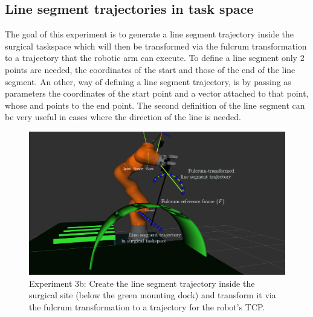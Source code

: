 \subsection{Line segment trajectories in task space}

The goal of this experiment is to generate a line segment trajectory inside the surgical
taskspace which will then be transformed via the fulcrum transformation to a trajectory that the robotic arm can execute. To define a line segment only 
2 points are needed, the coordinates of the start and those of the end of the line segment. An other, way of defining a line segment trajectory, 
is by passing as parameters the coordinates of the start point and a vector attached to that point, whose and points to the end point. The second definition 
of the line segment can be very useful in cases where the direction of the line is needed.

\begin{center}
\begin{figure}[!htb]
\centering
\includegraphics[width=\textwidth]{images/robot_planner3/3b_line_seg.png}
\caption{Experiment 3b: Create the line segment trajectory inside the surgical site (below the green mounting dock) and transform it via the fulcrum transformation to a trajectory for the robot's TCP.}
\label{robot-planner3b-line-seg}
\end{figure}
\end{center}


